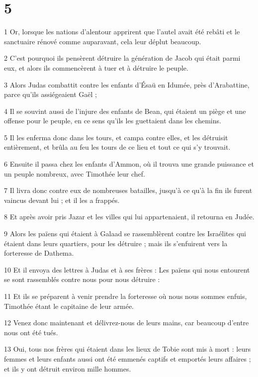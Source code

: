 \chapter{5}

\par 1 Or, lorsque les nations d'alentour apprirent que l'autel avait été rebâti et le sanctuaire rénové comme auparavant, cela leur déplut beaucoup.
\par 2 C'est pourquoi ils pensèrent détruire la génération de Jacob qui était parmi eux, et alors ils commencèrent à tuer et à détruire le peuple.
\par 3 Alors Judas combattit contre les enfants d'Ésaü en Idumée, près d'Arabattine, parce qu'ils assiégeaient Gaël ;
\par 4 Il se souvint aussi de l'injure des enfants de Bean, qui étaient un piège et une offense pour le peuple, en ce sens qu'ils les guettaient dans les chemins.
\par 5 Il les enferma donc dans les tours, et campa contre elles, et les détruisit entièrement, et brûla au feu les tours de ce lieu et tout ce qui s'y trouvait.
\par 6 Ensuite il passa chez les enfants d'Ammon, où il trouva une grande puissance et un peuple nombreux, avec Timothée leur chef.
\par 7 Il livra donc contre eux de nombreuses batailles, jusqu'à ce qu'à la fin ils furent vaincus devant lui ; et il les a frappés.
\par 8 Et après avoir pris Jazar et les villes qui lui appartenaient, il retourna en Judée.
\par 9 Alors les païens qui étaient à Galaad se rassemblèrent contre les Israélites qui étaient dans leurs quartiers, pour les détruire ; mais ils s'enfuirent vers la forteresse de Dathema.
\par 10 Et il envoya des lettres à Judas et à ses frères : Les païens qui nous entourent se sont rassemblés contre nous pour nous détruire :
\par 11 Et ils se préparent à venir prendre la forteresse où nous nous sommes enfuis, Timothée étant le capitaine de leur armée.
\par 12 Venez donc maintenant et délivrez-nous de leurs mains, car beaucoup d'entre nous ont été tués.
\par 13 Oui, tous nos frères qui étaient dans les lieux de Tobie sont mis à mort : leurs femmes et leurs enfants aussi ont été emmenés captifs et emportés leurs affaires ; et ils y ont détruit environ mille hommes.
